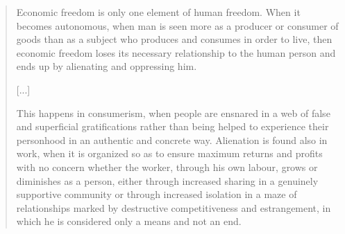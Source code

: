 \documentclass[letterpaper]{article}
\begin{document}
  \begin{quote}
    Economic freedom is only one element of human freedom. When it becomes autonomous, when man is seen more as a producer or consumer of goods than as a subject who produces and consumes in order to live, then economic freedom loses its necessary relationship to the human person and ends up by alienating and oppressing him.

    [...]


    This happens in consumerism, when people are ensnared in a web of false and superficial gratifications rather than being helped to experience their personhood in an authentic and concrete way. Alienation is found also in work, when it is organized so as to ensure maximum returns and profits with no concern whether the worker, through his own labour, grows or diminishes as a person, either through increased sharing in a genuinely supportive community or through increased isolation in a maze of relationships marked by destructive competitiveness and estrangement, in which he is considered only a means and not an end.


\end{quote}
\end{document}
